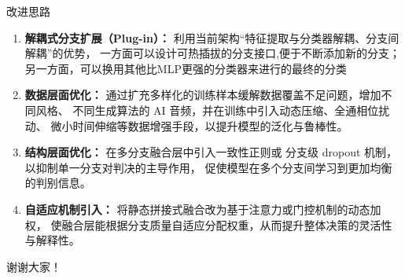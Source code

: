\documentclass[aspectratio=169]{beamer}
\providecommand{\paragraph}[1]{\smallskip\textbf{#1}\par}
\begin{document}
\begin{frame}{改进思路}
\begin{enumerate}
  \item \textbf{解耦式分支扩展（Plug-in）：}  
        利用当前架构“特征提取与分类器解耦、分支间解耦”的优势，
        一方面可以设计可热插拔的分支接口,便于不断添加新的分支；另一方面，可以换用其他比MLP更强的分类器来进行的最终的分类
  \item \textbf{数据层面优化：}  
        通过扩充多样化的训练样本缓解数据覆盖不足问题，增加不同风格、
        不同生成算法的 AI 音频，并在训练中引入动态压缩、全通相位扰动、
        微小时间伸缩等数据增强手段，以提升模型的泛化与鲁棒性。
  \item \textbf{结构层面优化：}  
        在多分支融合层中引入一致性正则或
        分支级 dropout 机制，以抑制单一分支对判决的主导作用，
        促使模型在多个分支间学习到更加均衡的判别信息。
  \item \textbf{自适应机制引入：}  
        将静态拼接式融合改为基于注意力或门控机制的动态加权，
        使融合层能根据分支质量自适应分配权重，从而提升整体决策的灵活性与解释性。
\end{enumerate}
\end{frame}
%
%
%

\begin{frame}[standout]
  谢谢大家！
\end{frame}
\end{document}
